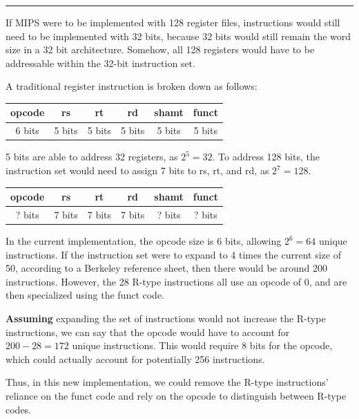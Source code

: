 \documentclass[11pt]{exam}
\newcounter{questionCounter}
\newcounter{partCounter}[questionCounter]
\newenvironment{namedquestion}[1]{%
    \addtocounter{questionCounter}{1}%
    \setcounter{partCounter}{0}%
    \vspace{.2in}%
        \noindent{\bf #1}%
    \vspace{0.3em} \hrule \vspace{.1in}%
}{}
\begin{document}
\begin{namedquestion}{Question 2.18.1}
If MIPS were to be implemented with 128 register files, instructions would still need to be implemented with 32 bits, because 32 bits would still remain the word size in a 32 bit architecture. Somehow, all 128 registers would have to be addressable within the 32-bit instruction set.

A traditional register instruction is broken down as follows:

\begingroup
    \medskip
    \centering
    \def\arraystretch{1.5}
        \begin{tabular}{cccccc}
            \toprule
            opcode & rs & rt & rd & shamt & funct\\
            \midrule
            6 bits & 5 bits & 5 bits & 5 bits & 5 bits & 5 bits\\
            \bottomrule
        \end{tabular}
    \label{fig:c2table2}
    \medskip
\endgroup

5 bits are able to address 32 registers, as $2^{5} = 32$. To address 128 bits, the instruction set would need to assign 7 bits to rs, rt, and rd, as $2^{7} = 128$.

\begingroup
    \medskip
    \centering
    \def\arraystretch{1.5}
        \begin{tabular}{cccccc}
            \toprule
            opcode & rs & rt & rd & shamt & funct\\
            \midrule
            ? bits & 7 bits & 7 bits & 7 bits & ? bits & ? bits\\
            \bottomrule
        \end{tabular}
    \label{fig:c2table2}
    \medskip
\endgroup

In the current implementation, the opcode size is 6 bits, allowing $2^6 = 64$ unique instructions. If the instruction set were to expand to 4 times the current size of 50, according to a Berkeley reference sheet\cite{mipsref}, then there would be around 200 instructions. However, the 28\cite{mipsref} R-type instructions all use an opcode of 0, and are then specialized using the funct code.

\textbf{Assuming} expanding the set of instructions would not increase the R-type instructions, we can say that the opcode would have to account for $200-28 = 172$ unique instructions. This would require 8 bits for the opcode, which could actually account for potentially 256 instructions.  

Thus, in this new implementation, we could remove the R-type instructions' reliance on the funct code and rely on the opcode to distinguish between R-type codes. 


\end{namedquestion}
\end{document}
